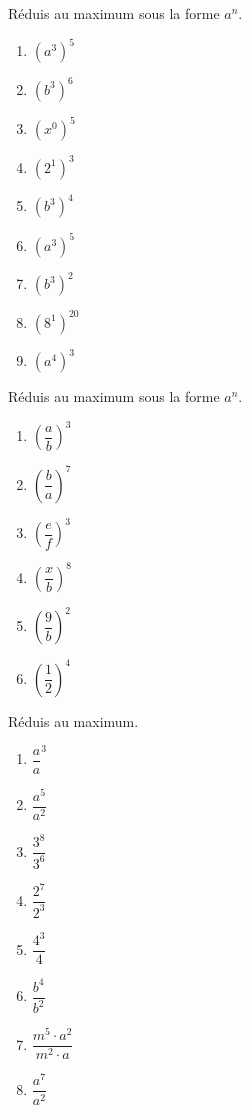 \begin{exercise}
  Réduis au maximum sous la forme $a^n$.
  \begin{enumerate}[cols=6]
\item \(\left( a^{3} \right)^{5} \)
\item \(\left( b^{3} \right)^{6} \)
\item \(\left( x^{0} \right)^{5} \)
\item \(\left( 2^{1} \right)^{3} \)
\item \(\left( b^{3} \right)^{4} \)
\item \(\left( a^{3} \right)^{5} \)
\item \(\left( b^{3} \right)^{2} \)
\item \(\left( 8^{1} \right)^{20} \)
\item \(\left( a^{4} \right)^{3} \)
  \end{enumerate}
\end{exercise}

\begin{exercise}
  Réduis au maximum sous la forme $a^n$.
  \begin{enumerate}[cols=6]
    \item \(\left( \dfrac{a}{b} \right)^{3} \)
    \item \(\left( \dfrac{b}{a} \right)^{7} \)
    \item \(\left( \dfrac{e}{f} \right)^{3} \)
    \item \(\left( \dfrac{x}{b} \right)^{8} \)
    \item \(\left( \dfrac{9}{b} \right)^{2} \)
    \item \(\left( \dfrac{1}{2} \right)^{4} \)
  \end{enumerate}
\end{exercise}

\begin{exercise}
  Réduis au maximum.
  \begin{enumerate}[cols=4]
    \item \(\dfrac{a}{a}^{3} \)
    \item \(\dfrac{a^{5}}{a^{2}} \)
    \item \(\dfrac{3^{8}}{3^{6}} \)
    \item \(\dfrac{2^{7}}{2^{3}} \)
    \item \(\dfrac{4^{3}}{4} \)
    \item \(\dfrac{b^{4}}{b^{2}} \)
    \item \(\dfrac{m^{5} \cdot a^{2}}{m^{2} \cdot a}\)
    \item \(\dfrac{a^{7}}{a^{2}}\)

  \end{enumerate}
\end{exercise}


